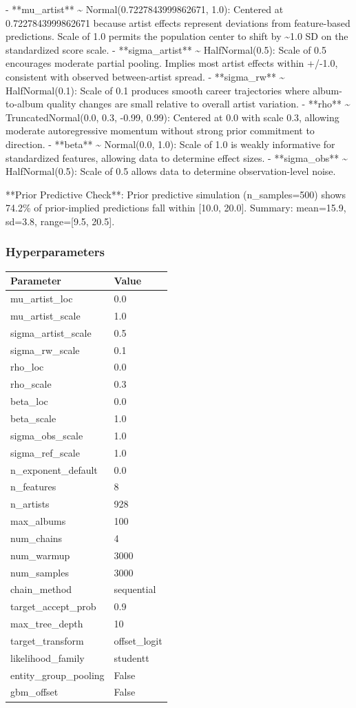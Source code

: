 \documentclass{article}
\begin{document}
- **mu\_artist** \textasciitilde{} Normal(0.7227843999862671, 1.0): Centered at 0.7227843999862671 because artist effects represent deviations from feature-based predictions. Scale of 1.0 permits the population center to shift by \textasciitilde{}1.0 SD on the standardized score scale.
- **sigma\_artist** \textasciitilde{} HalfNormal(0.5): Scale of 0.5 encourages moderate partial pooling. Implies most artist effects within +/-1.0, consistent with observed between-artist spread.
- **sigma\_rw** \textasciitilde{} HalfNormal(0.1): Scale of 0.1 produces smooth career trajectories where album-to-album quality changes are small relative to overall artist variation.
- **rho** \textasciitilde{} TruncatedNormal(0.0, 0.3, -0.99, 0.99): Centered at 0.0 with scale 0.3, allowing moderate autoregressive momentum without strong prior commitment to direction.
- **beta** \textasciitilde{} Normal(0.0, 1.0): Scale of 1.0 is weakly informative for standardized features, allowing data to determine effect sizes.
- **sigma\_obs** \textasciitilde{} HalfNormal(0.5): Scale of 0.5 allows data to determine observation-level noise.


**Prior Predictive Check**: Prior predictive simulation (n\_samples=500) shows 74.2\% of prior-implied predictions fall within [10.0, 20.0]. Summary: mean=15.9, sd=3.8, range=[9.5, 20.5].

\subsubsection*{Hyperparameters}
\begin{tabular}{ll}
\toprule
Parameter & Value \\
\midrule
mu\_artist\_loc & 0.0 \\
mu\_artist\_scale & 1.0 \\
sigma\_artist\_scale & 0.5 \\
sigma\_rw\_scale & 0.1 \\
rho\_loc & 0.0 \\
rho\_scale & 0.3 \\
beta\_loc & 0.0 \\
beta\_scale & 1.0 \\
sigma\_obs\_scale & 1.0 \\
sigma\_ref\_scale & 1.0 \\
n\_exponent\_default & 0.0 \\
n\_features & 8 \\
n\_artists & 928 \\
max\_albums & 100 \\
num\_chains & 4 \\
num\_warmup & 3000 \\
num\_samples & 3000 \\
chain\_method & sequential \\
target\_accept\_prob & 0.9 \\
max\_tree\_depth & 10 \\
target\_transform & offset\_logit \\
likelihood\_family & studentt \\
entity\_group\_pooling & False \\
gbm\_offset & False \\
\bottomrule
\end{tabular}
\end{document}

